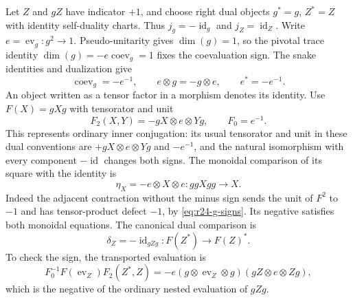 Let $Z$ and $gZ$ have indicator $+1$, and choose right dual objects
$g^*=g$, $Z^*=Z$ with identity self-duality charts. Thus
$j_g=-\operatorname{id}_g$ and $j_Z=\operatorname{id}_Z$.
Write $e=\operatorname{ev}_g:g^2\to1$. Pseudo-unitarity gives
$\dim(g)=1$, so the pivotal trace identity
$\dim(g)=-e\operatorname{coev}_g=1$ fixes the coevaluation sign.
The snake identities and dualization give
\begin{equation}\label{eq:r24-g-signs}
 \operatorname{coev}_g=-e^{-1},\qquad
 e\otimes g=-g\otimes e,\qquad e^*=-e^{-1}.
\end{equation}
An object written as a tensor factor in a morphism denotes its identity.
Use $F(X)=gXg$ with tensorator and unit
\[
 F_2(X,Y)=-gX\otimes e\otimes Yg,
 \qquad F_0=e^{-1}.
\]
This represents ordinary inner conjugation: its usual tensorator and
unit in these dual conventions are $+gX\otimes e\otimes Yg$ and
$-e^{-1}$, and the natural isomorphism with every component
$-\operatorname{id}$ changes both signs. The monoidal comparison of
its square with the identity is
\begin{equation}\label{eq:r24-square-comparison}
 \eta_X=-e\otimes X\otimes e:ggXgg\longrightarrow X.
\end{equation}
Indeed the adjacent contraction without the minus sign sends the
unit of $F^2$ to $-1$ and has tensor-product defect $-1$, by
\eqref{eq:r24-g-signs}. Its negative satisfies both monoidal equations.
The canonical dual comparison is
\begin{equation}\label{eq:r24-dual-comparison}
 \delta_Z=-\operatorname{id}_{gZg}:F(Z^*)\longrightarrow F(Z)^*.
\end{equation}
To check the sign, the transported evaluation is
\[
 F_0^{-1}F(\operatorname{ev}_Z)F_2(Z^*,Z)
 =-e(g\otimes\operatorname{ev}_Z\otimes g)
       (gZ\otimes e\otimes Zg),
\]
which is the negative of the ordinary nested evaluation of $gZg$.

